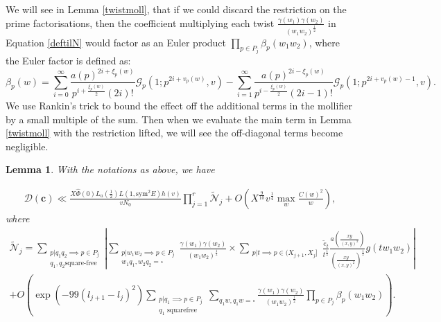 \documentclass[12pt]{amsart}
\numberwithin{equation}{section}
\newtheorem{lem}[thm]{Lemma}
\numberwithin{thm}{section}
\newcommand{\1}{\mathbf 1}
\begin{document}
We will see in Lemma \ref{twistmoll}, that if we could discard the restriction on the prime factorisations, then the coefficient multiplying each twist $\frac{\gamma(w_1)\gamma(w_2)}{(w_1w_2)^{\frac{1}{2}}} $ in Equation \eqref{deftilN} would factor as an Euler product $\prod_{p\in P_{j}} 	\beta_p(w_1w_2)$, 	where the Euler factor is defined as: 
\begin{equation}\label{betaf}
	\beta_p(w)=\sum^{\infty}_{i=0}  \frac{a(p)^{2i+\xi_{p}(w)}}{p^{i+\frac{\xi_p(w)}{2}}(2i)!}\mathcal{G}_p(1;p^{2i+v_p(w)},v)-\sum^\infty_{i=1}\frac{a(p)^{2i-\xi_{p}(w)}}{p^{i-\frac{\xi_p(w)}{2}}(2i-1)!} \mathcal{G}_p(1;p^{2i+v_p(w)-1},v).
\end{equation}
We use Rankin's trick to bound the effect off the additional terms in the mollifier by a small multiple of the sum. Then when we evaluate the main term in Lemma \ref{twistmoll} with the restriction lifted, we will see the off-diagonal terms become negligible. 
 



	\begin{lem}\label{Chernprop}
	With the notations as above, we have
	
	\begin{equation}\begin{split}\label{wellfactorsmooth}
			\mathscr{D}(\mathbf{c})\ll \frac{X\hat{\Phi}(0)L_a\left(\frac{1}{2}\right)L(1,\text{sym}^2E)h(v)}{vN_0}\prod^{r}_{j=1}\tilde{\mathscr{N}}_j+O\left(X^{\frac{9}{10}}v^{\frac{1}{4}}\max_w\frac{C(w)^2}{w}\right),
	\end{split}\end{equation} where
	\begin{align}\label{defN}\tilde{\mathscr{N}}_j=\sum_{\substack{p|q_1q_2\implies p\in P_{j}\\ q_1,q_2\text{square-free}}}\left|\sum_{\substack{p|w_1w_2\implies p\in P_{j}\\ w_1q_1,w_2q_2=\square}}\frac{\gamma(w_1)\gamma(w_2)}{(w_1w_2)^{\frac{1}{2}}}\times%
		\sum_{\substack{p|t\implies p\in (X_{j+1},X_{j}]}}			
		\frac{\tilde{e}_{t}}{t^{\frac{1}{2}}} \frac{a\left(\frac{xy}{(x,y)^2}\right)}{ \left(\frac{xy}{(x,y)^2}\right)^{\frac{1}{2}}}g(tw_1w_2)
		\right|\\+O\left(\exp(-99(l_{j+1}-l_{j})^2)\sum_{\substack{p|q_1\implies p\in P_{j}\\ q_1\text{  squarefree}}}\sum_{q_1w,q_1w=\square} \frac{\gamma(w_1)\gamma(w_2)}{(w_1w_2)^{\frac{1}{2}}} \prod_{p\in P_{j}} 	\beta_p(w_1w_2)\right).
	\end{align}
\end{lem}
\end{document}
